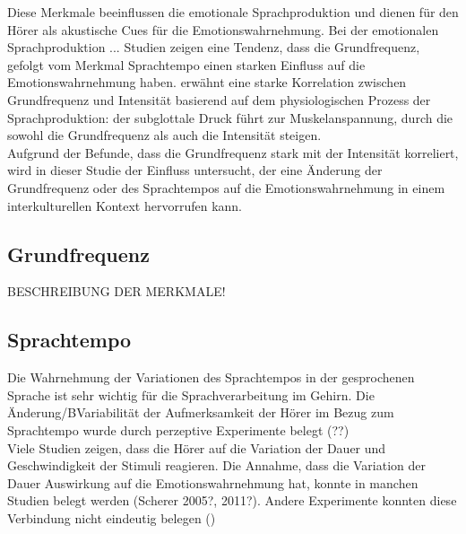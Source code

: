 \documentclass[11pt,a4paper,headsepline,twoside,toc=bibliography]{scrreprt}
\begin{document}
Diese Merkmale beeinflussen die emotionale Sprachproduktion und dienen für den Hörer als akustische Cues für die Emotionswahrnehmung. Bei der emotionalen Sprachproduktion ... 
Studien zeigen eine Tendenz, dass die Grundfrequenz, gefolgt vom Merkmal Sprachtempo
einen starken Einfluss auf die Emotionswahrnehmung haben. \citeauthor{Banse1996} erwähnt eine starke Korrelation zwischen Grundfrequenz und Intensität basierend auf dem physiologischen Prozess der Sprachproduktion: der subglottale Druck führt zur Muskelanspannung, durch die sowohl die Grundfrequenz als auch die Intensität steigen.\\

Aufgrund der Befunde, dass die Grundfrequenz stark mit der Intensität korreliert, wird in dieser Studie der Einfluss untersucht, der eine Änderung der Grundfrequenz oder des Sprachtempos auf die Emotionswahrnehmung in einem interkulturellen Kontext hervorrufen kann.

\subsection{Grundfrequenz}

 BESCHREIBUNG DER MERKMALE! \\

\subsection{Sprachtempo}

Die Wahrnehmung der Variationen des Sprachtempos in der gesprochenen Sprache ist sehr wichtig für die Sprachverarbeitung im Gehirn. Die Änderung/BVariabilität der Aufmerksamkeit der Hörer im Bezug zum Sprachtempo wurde durch perzeptive Experimente belegt (??) \\ 
 

 
Viele Studien zeigen, dass die Hörer auf die Variation der Dauer und Geschwindigkeit der Stimuli reagieren. Die Annahme, dass die Variation der Dauer Auswirkung auf die Emotionswahrnehmung hat, konnte in manchen Studien belegt werden (Scherer 2005?, 2011?). Andere Experimente konnten diese Verbindung nicht eindeutig belegen (\cite{Schirmer2016a})\\
\end{document}
